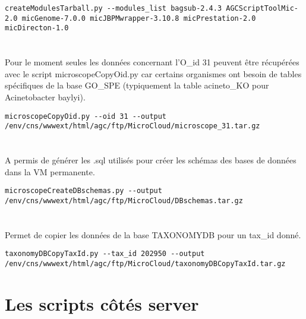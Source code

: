 \begin{lstlisting}[style=bash]
createModulesTarball.py --modules_list bagsub-2.4.3 AGCScriptToolMic-2.0 micGenome-7.0.0 micJBPMwrapper-3.10.8 micPrestation-2.0 micDirecton-1.0
\end{lstlisting}

\section{}

\begin{mycolorbox}
	Pour le moment seules les données concernant l'O\_id 31 peuvent être récupérées avec le script microscopeCopyOid.py car certains organismes ont besoin de tables spécifiques de la base GO\_SPE (typiquement la table acineto\_KO pour Acinetobacter baylyi).
\end{mycolorbox}

\begin{lstlisting}[style=bash]
microscopeCopyOid.py --oid 31 --output /env/cns/wwwext/html/agc/ftp/MicroCloud/microscope_31.tar.gz
\end{lstlisting}

\section{}
A permis de générer les .sql utilisés pour créer les schémas des bases de données dans la VM permanente.

\begin{lstlisting}[style=bash]
microscopeCreateDBschemas.py --output /env/cns/wwwext/html/agc/ftp/MicroCloud/DBschemas.tar.gz
\end{lstlisting}

\section{}
Permet de copier les données de la base TAXONOMYDB pour un tax\_id donné.

\begin{lstlisting}[style=bash]
taxonomyDBCopyTaxId.py --tax_id 202950 --output /env/cns/wwwext/html/agc/ftp/MicroCloud/taxonomyDBCopyTaxId.tar.gz
\end{lstlisting}

\section{Les scripts côtés server}

